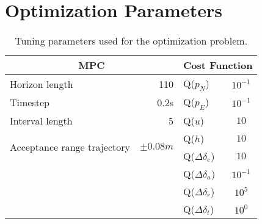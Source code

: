 \newpage
\section{Optimization Parameters}

\begin{table}[h]
\centering
\begin{tabular}{| l r | l c |}
    \hline
    \multicolumn{2}{|c|}{MPC} & \multicolumn{2}{c|}{Cost Function} \\
    \hline
    Horizon length & 110 & Q($p_N$) & $10^{-1}$\\
    Timestep       & 0.2s & Q($p_E$) & $10^{-1}$\\
    Interval length & 5 & Q($u$) & $10$\\
    \multirow{2}{2.5cm}{Acceptance range trajectory} & \multirow{2}{*}{$\pm 0.08m$} & Q($h$) & $10$\\
    & & Q($\Delta \delta_e$) & $10$\\
    & & Q($\Delta \delta_a$) & $10^{-1}$\\
    & & Q($\Delta \delta_r$) & $10^{5}$\\
    & & Q($\Delta \delta_t$) & $10^{0}$\\
    \hline
\end{tabular}
\caption{Tuning parameters used for the optimization problem.}
\label{tab:opt_param}
\end{table}